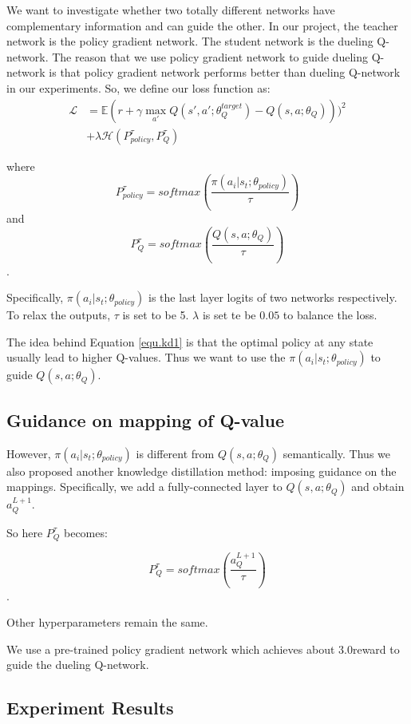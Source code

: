 %
We want to investigate whether two totally different networks have complementary information and can guide the other.
%
In our project, the teacher network is the policy gradient network. The student network is the dueling Q-network. The reason that we use policy gradient network to guide dueling Q-network is that policy gradient network performs better than dueling Q-network in our experiments.
%
So, we define our loss function as:
\begin{equation}
\begin{split}
\mathcal{L} &= \mathbb{E}(r+\gamma \max_{a'}Q(s',a';\theta^{target}_{Q})-Q(s,a;\theta_{Q})))^2  \\
& + \lambda\mathcal{H} ( P^{\tau}_{policy},P^{\tau}_{Q} )
\end{split}
\label{equ.kd1}
\end{equation}

\noindent
where 
$$P^{\tau}_{policy} = softmax(\frac{\pi(a_i|s_t;\theta_{policy})}{\tau})$$
and  
$$P^{\tau}_{Q} = softmax( \frac{Q(s,a;\theta_{Q})} {\tau} )$$.

\noindent
Specifically, $\pi(a_i|s_t;\theta_{policy})$ is the last layer logits of two networks respectively. To relax the outputs, $\tau$ is set to be 5. $\lambda$ is set te be $0.05$ to balance the loss.

The idea behind Equation \ref{equ.kd1} is that the optimal policy at any state usually lead to higher Q-values. Thus we want to use the $\pi(a_i|s_t;\theta_{policy})$ to guide $Q(s,a;\theta_{Q})$.

\subsection{Guidance on mapping of Q-value}
However,  $\pi(a_i|s_t;\theta_{policy})$ is different from $Q(s,a;\theta_{Q})$ semantically. Thus we also proposed another knowledge distillation method: imposing guidance on the mappings.
%
Specifically, we add a fully-connected layer to $Q(s,a;\theta_{Q})$ and obtain  $a^{L+1}_{Q}$.

So here $P^{\tau}_{Q}$ becomes:

$$P^{\tau}_{Q} = softmax( \frac{a^{L+1}_{Q}} {\tau} )$$.

\noindent
Other hyperparameters remain the same.

%
We use a pre-trained policy gradient network which achieves about $3.0$reward to guide the dueling Q-network.


\subsection{Experiment Results}

